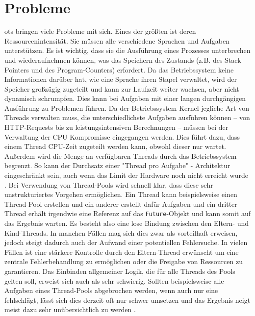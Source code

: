     
\section{Probleme}                                         
\label{sec:Probleme}

    \Glspl{ot} bringen viele Probleme mit sich. Eines der größten ist deren Ressourcenintensität.
    Sie müssen alle verschiedene Sprachen und Aufgaben unterstützen. Es ist wichtig, dass sie die Ausführung eines Prozesses unterbrechen und
    wiederaufnehmen können, 
    was das Speichern des Zustands (z.B. des Stack-Pointers und des Program-Counters) erfordert. Da das Betriebssystem keine Informationen darüber hat, wie
    eine Sprache ihren Stapel verwaltet, wird der Speicher großzügig zugeteilt und kann zur Laufzeit weiter wachsen, aber nicht dynamisch schrumpfen. Dies kann
    bei Aufgaben mit einer langen durchgängigen Ausführung zu Problemen führen. Da der Betriebssystem-Kernel jegliche Art von Threads verwalten muss,
    die unterschiedlichste Aufgaben ausführen können -- von HTTP-Requests bis zu leistungsintensiven Berechnungen -- müssen bei der
    Verwaltung der CPU Kompromisse eingegangen werden. Dies führt dazu, dass einem Thread CPU-Zeit zugeteilt werden kann, obwohl dieser nur wartet. Außerdem wird die Menge 
    an verfügbaren Threads durch das Betriebssystem begrenzt. So kann der Durchsatz einer "Thread pro Aufgabe" - Architektur eingeschränkt sein, auch wenn das Limit der 
    Hardware noch nicht erreicht wurde \cite{ProjectLoom}. Bei Verwendung von Thread-Pools wird schnell klar, dass diese sehr unstrukturiertes Vorgehen ermöglichen. Ein Thread kann beispielsweise 
    einen Thread-Pool erstellen und ein anderer erstellt dafür Aufgaben und ein dritter Thread erhält irgendwie eine Referenz auf das \texttt{Future}-Objekt und kann somit auf das Ergebnis warten.
    Es besteht also eine lose Bindung zwischen den Eltern- und Kind-Threads. In manchen Fällen mag sich dies zwar als vorteilhaft erweisen, jedoch steigt dadurch auch der Aufwand einer potentiellen 
    Fehlersuche. In vielen Fällen ist eine stärkere Kontrolle durch den Eltern-Thread erwünscht um \zB eine zentrale Fehlerbehandlung zu ermöglichen oder die Freigabe von Ressourcen zu garantieren.
    Das Einbinden allgemeiner Logik, die für alle Threads des Pools gelten soll, erweist sich auch als sehr schwierig. Sollten beispielsweise alle Aufgaben eines Thread-Pools abgebrochen werden,
    wenn auch nur eine fehlschlägt, lässt sich dies derzeit oft nur schwer umsetzen und das Ergebnis neigt meist dazu sehr unübersichtlich zu werden \cite{JEP453}. 
    

